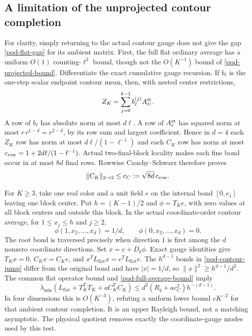 \subsection{A limitation of the unprojected contour completion}
\label{pqd-contour-section}

For clarity, simply returning to the actual contour gauge does not give
the gap \eqref{pqd-flat-gap} for its ambient matrix. First, the full flat
ordinary average has a uniform $O(1)$ counting-$\ell^2$ bound, though
not the $O(K^{-1})$ bound of \eqref{pqd-projected-bound}. Differentiate
the exact cumulative gauge recursion. If $b_\ell$ is the one-step
scalar endpoint contour mean, then, with nested center restrictions,
\begin{equation}
 Z_K=\sum_{j=0}^{k-1}b_\ell^{(j)}A_{\ell^j}^{\rm st}.
 \label{pqd-gauge-recursion}
\end{equation}
A row of $b_\ell$ has absolute norm at most $d\ell$. A row of
$A_r^{\rm st}$ has squared norm at most
$r\,r^{1-d}=r^{2-d}$, by its row sum and largest coefficient. Hence in
$d=4$ each $Z_K$ row has norm at most $d\ell/(1-\ell^{-1})$ and each
$C_K$ row has norm at most
$c_{\rm row}=1+2d\ell/(1-\ell^{-1})$. Actual two-final-block locality
makes each fine bond occur in at most $8d$ final rows. Rowwise
Cauchy--Schwarz therefore proves
\begin{equation}
 \|C_K\|_{2\to2}\le c_C:=\sqrt{8d}\,c_{\rm row}.
 \label{pqd-full-average-bound}
\end{equation}

For $K\ge3$, take one real color and a unit field $e$ on the internal bond $[0,e_1]$
leaving one block center. Put $h=(K-1)/2$ and $\phi=T_Ke$, with zero
values at all block centers and outside this block. In the actual
coordinate-order contour average, for $1\le x_j\le h$ and $j\ge2$,
\begin{equation}
 \phi(1,x_2,\ldots,x_d)=1/d,\qquad
 \phi(0,x_2,\ldots,x_d)=0.\label{pqd-contour-jump}
\end{equation}
The root bond is traversed precisely when direction $1$ is first among
the $d$ nonzero coordinate directions. Set $x=e+D_b\phi$. Exact gauge
identities give $T_Kx=0$, $C_Kx=C_Ke$, and
$x^TL_{\mathrm{flat}}x=e^TL_{\mathrm{flat}}e$. The $h^{d-1}$ bonds in
\eqref{pqd-contour-jump} differ from the original bond and have
$|x|=1/d$, so $\|x\|^2\ge h^{d-1}/d^2$. The common flat operator
bound and \eqref{pqd-full-average-bound} imply
\begin{equation}
 \lambda_{\min}(L_{\mathrm{flat}}+T_K^TT_K+aC_K^TC_K)
 \le d^2(R_q+ac_C^2)h^{-(d-1)}.
 \label{pqd-contour-obstruction}
\end{equation}
In four dimensions this is $O(K^{-3})$, refuting a uniform lower bound
$cK^{-2}$ for that ambient contour completion. It is an upper Rayleigh
bound, not a matching asymptotic. The physical quotient removes exactly
the coordinate-gauge modes used by this test.

